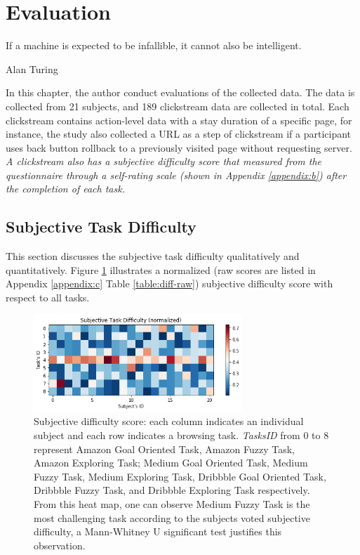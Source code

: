 \section{Evaluation}
\label{ch:eval}

\epigraph{If a machine is expected to be infallible, it cannot also be intelligent.}{Alan Turing}

In this chapter, the author conduct evaluations of the collected data.
The data is collected from 21 subjects, and 189 clickstream data are collected in total. 
Each clickstream contains action-level data with a stay duration
of a specific page, for instance, the study also collected a URL as a step of clickstream 
if a participant uses back button rollback to a previously visited page
without requesting server. 
\emph{A clickstream also has a subjective difficulty score that measured from the questionnaire 
through a self-rating scale (shown in Appendix \ref{appendix:b}) after the completion of each task.}

\subsection{Subjective Task Difficulty}
\label{sec:task-diff}

This section discusses the subjective task difficulty qualitatively and quantitatively.
Figure \ref{fig:difficulty} illustrates a normalized (raw scores are listed in 
Appendix \ref{appendix:c} Table \ref{table:diff-raw}) subjective difficulty score 
with respect to all tasks.

\begin{figure}[H]
    \centering
    \includegraphics[width=0.7\textwidth]{figures/difficulty}
    \caption{Subjective difficulty score: each column indicates an individual subject 
    and each row indicates a browsing task. \emph{TasksID} from 0 to 8 represent 
    Amazon Goal Oriented Task, Amazon Fuzzy Task, Amazon Exploring Task; 
    Medium Goal Oriented Task, Medium Fuzzy Task, Medium Exploring Task, 
    Dribbble Goal Oriented Task, Dribbble Fuzzy Task, 
    and Dribbble Exploring Task respectively.
    From this heat map, one can observe Medium Fuzzy Task is the most challenging task 
    according to the subjects voted subjective difficulty, 
    a Mann-Whitney U significant test justifies this observation.}
    \label{fig:difficulty}
\end{figure}

